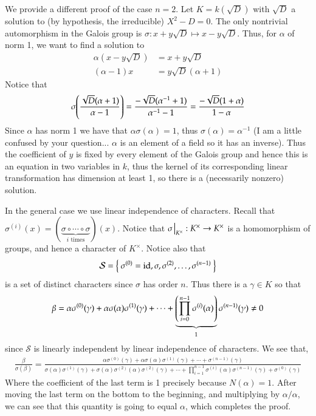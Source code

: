 \documentclass[12pt]{article}
\theoremstyle{definitionstyle}
\begin{document}
	We provide a different proof of the case $n=2$. Let $K = k(\sqrt{D})$ with $\sqrt{D}$ a solution to (by hypothesis, the irreducible) $X^2 - D = 0$. The only nontrivial automorphism in the Galois group is $\sigma: x + y\sqrt{D} \mapsto x - y\sqrt{D}$. Thus, for $\alpha$ of norm 1, we want to find a solution to
	\begin{align*}
		\alpha(x-y\sqrt{D}) &= x+y\sqrt{D} \\
		(\alpha-1)x &= y\sqrt{D}(\alpha+1)
	\end{align*}
	Notice that
	\begin{align*}
		\sigma\qty(\frac{\sqrt{D}(\alpha+1)}{\alpha-1}) = \frac{-\sqrt{D}(\alpha^{-1} + 1)}{\alpha^{-1} - 1} = \frac{-\sqrt{D}(1+\alpha)}{1-\alpha}
	\end{align*}
	Since $\alpha$ has norm 1 we have that $\alpha \sigma(\alpha) = 1$, thus $\sigma(\alpha) = \alpha^{-1}$ (I am a little confused by your question... $\alpha$ is an element of a field so it has an inverse). Thus the coefficient of $y$ is fixed by every element of the Galois group and hence this is an equation in two variables in $k$, thus the kernel of its corresponding linear transformation has dimension at least 1, so there is a (necessarily nonzero) solution.
	
	In the general case we use linear independence of characters. Recall that $\sigma^{(i)}(x) = (\underbrace{\sigma \circ \cdots \circ \sigma}_{\text{$i$ times}})(x)$. Notice that $\sigma \eval_{K^\times}: K^\times \to K^\times$ is a homomorphism of groups, and hence a character of $K^\times$. Notice also that 
	\begin{align*}
		\mathcal{S} = \Set{\sigma^{(0)} = \mathrm{id}, \sigma, \sigma^{(2)}, \ldots, \sigma^{(n-1)}}
	\end{align*}
	is a set of distinct characters since $\sigma$ has order $n$. Thus there is a $\gamma \in K$ so that
	\begin{align*}
		\beta = \alpha \sigma^{(0)}(\gamma) + \alpha \sigma(\alpha) \sigma^{(1)}(\gamma) + \cdots + \underbrace{\qty(\prod_{i=0}^{n-1} \sigma^{(i)}(\alpha))}_{1} \sigma^{(n-1)}(\gamma) \neq 0
	\end{align*}
	since $\mathcal{S}$ is linearly independent by linear independence of characters. We see that,
	\begin{align*}
		\frac{\beta}{\sigma(\beta)} = \frac{\alpha \sigma^{(0)}(\gamma) + \alpha \sigma(\alpha) \sigma^{(1)}(\gamma) + \cdots + \sigma^{(n-1)}(\gamma)}{\sigma(\alpha) \sigma^{(1)}(\gamma) + \sigma(\alpha)\sigma^{(2)}(\alpha) \sigma^{(2)}(\gamma) + \cdots + \prod_{i=1}^{n-1} \sigma^{(i)}(\alpha) \sigma^{(n-1)}(\gamma) + \sigma^{(0)}(\gamma)}
	\end{align*}
	Where the coefficient of the last term is 1 precisely because $N(\alpha) = 1$. After moving the last term on the bottom to the beginning, and multiplying by $\alpha/\alpha$, we can see that this quantity is going to equal $\alpha$, which completes the proof.
\end{document}
